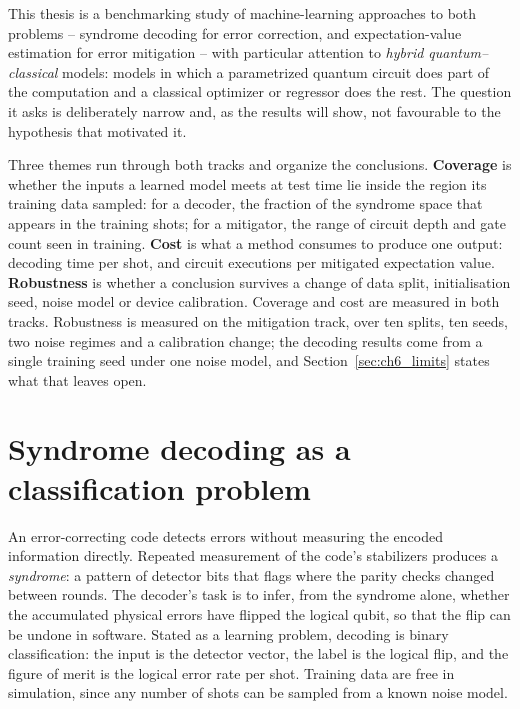 \documentclass[Thesis.tex]{subfiles}
\begin{document}
This thesis is a benchmarking study of machine-learning approaches to both problems
-- syndrome decoding for error correction, and expectation-value estimation for
error mitigation -- with particular attention to \emph{hybrid quantum--classical}
models: models in which a parametrized quantum circuit does part of the computation
and a classical optimizer or regressor does the rest. The question it asks is
deliberately narrow and, as the results will show, not favourable to the hypothesis
that motivated it.

Three themes run through both tracks and organize the conclusions.
\textbf{Coverage} is whether the inputs a learned model meets at test time lie
inside the region its training data sampled: for a decoder, the fraction of the
syndrome space that appears in the training shots; for a mitigator, the range of
circuit depth and gate count seen in training. \textbf{Cost} is what a method
consumes to produce one output: decoding time per shot, and circuit executions per
mitigated expectation value. \textbf{Robustness} is whether a conclusion survives a
change of data split, initialisation seed, noise model or device calibration.
Coverage and cost are measured in both tracks. Robustness is measured on the
mitigation track, over ten splits, ten seeds, two noise regimes and a calibration
change; the decoding results come from a single training seed under one noise
model, and Section~\ref{sec:ch6_limits} states what that leaves open.

\section{Syndrome decoding as a classification problem}

An error-correcting code detects errors without measuring the encoded information
directly. Repeated measurement of the code's stabilizers produces a
\emph{syndrome}: a pattern of detector bits that flags where the parity checks
changed between rounds. The decoder's task is to infer, from the syndrome alone,
whether the accumulated physical errors have flipped the logical qubit, so that the
flip can be undone in software. Stated as a learning problem, decoding is binary
classification: the input is the detector vector, the label is the logical flip, and
the figure of merit is the logical error rate per shot. Training data are free in
simulation, since any number of shots can be sampled from a known noise model.
\end{document}
